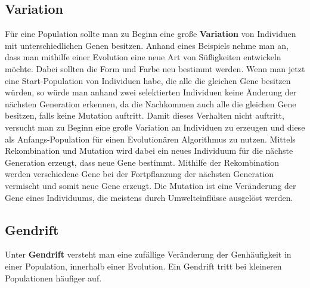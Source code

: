 \subsection{Variation}

F{\"u}r eine Population sollte man zu Beginn eine gro{\ss}e \textbf{Variation} von Individuen mit unterschiedlichen Genen besitzen. 
Anhand eines Beispiels nehme man an, dass man mithilfe einer Evolution eine neue Art von S{\"u}{\ss}igkeiten entwickeln m{\"o}chte. Dabei sollten die Form und Farbe neu bestimmt werden. 
Wenn man jetzt eine Start-Population von Individuen habe, die alle die gleichen Gene besitzen w{\"u}rden, so w{\"u}rde man anhand zwei selektierten Individuen keine {\"A}nderung der n{\"a}chsten Generation erkennen, da die Nachkommen auch alle die gleichen Gene besitzen, falls keine Mutation auftritt.
Damit dieses Verhalten nicht auftritt, versucht man zu Beginn eine gro{\ss}e Variation an Individuen zu erzeugen und diese als Anfangs-Population f{\"u}r einen Evolution{\"a}ren Algorithmus zu nutzen. 
Mittels Rekombination und Mutation wird dabei ein neues Individuum f{\"u}r die n{\"a}chste Generation erzeugt, dass neue Gene bestimmt.
Mithilfe der Rekombination werden verschiedene Gene bei der Fortpflanzung der n{\"a}chsten Generation vermischt und somit neue Gene erzeugt. Die Mutation ist eine Ver{\"a}nderung der Gene eines Individuums, die meistens durch Umwelteinfl{\"u}sse ausgel{\"o}st werden. \cite{flickevolutionare} 



\subsection{Gendrift}
Unter \textbf{Gendrift} versteht man eine zuf{\"a}llige Ver{\"a}nderung der Genh{\"a}ufigkeit in einer Population, innerhalb einer Evolution. Ein Gendrift tritt bei kleineren Populationen h{\"a}ufiger auf. \cite{brockhausonline} %


